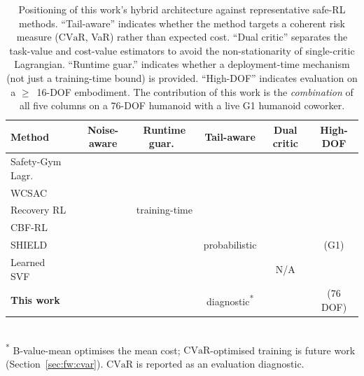 \documentclass[11pt,a4paper]{report}
\newcommand{\cvar}{\ensuremath{\mathrm{CVaR}}}
\newcommand{\cmark}{\ding{51}}
\newcommand{\xmark}{\ding{55}}
\begin{document}
\begin{table}[h]
\centering
\caption{Positioning of this work's hybrid architecture against
representative safe-RL methods. ``Tail-aware'' indicates whether the
method targets a coherent risk measure (\cvar{}, VaR) rather than
expected cost. ``Dual critic'' separates the task-value and
cost-value estimators to avoid the non-stationarity of
single-critic Lagrangian. ``Runtime guar.'' indicates whether a
deployment-time mechanism (not just a training-time bound) is
provided. ``High-DOF'' indicates evaluation on a $\ge$~16-DOF
embodiment. The contribution of this work is the \emph{combination}
of all five columns on a 76-DOF humanoid with a live G1 humanoid
coworker.}
\label{tab:related-work-comparison}
\small
\begin{tabular}{lccccc}
\toprule
Method & Noise-aware & Runtime guar.\ & Tail-aware & Dual critic & High-DOF \\
\midrule
Safety-Gym Lagr.~\cite{ray2019safetygym}    & \xmark & \xmark & \xmark & \xmark & \xmark \\
WCSAC~\cite{yang2021wcsac}                  & \xmark & \xmark & \cmark & \cmark & \xmark \\
Recovery RL~\cite{thananjeyan2021recovery}  & \xmark & training-time & \xmark & \cmark & \xmark \\
CBF-RL~\cite{cbfrl2024}                     & \xmark & \cmark & \xmark & \xmark & \xmark \\
SHIELD~\cite{shield2025}                    & \xmark & \cmark & probabilistic & \xmark & \cmark (G1) \\
Learned SVF~\cite{srinivasan2020learning}   & \xmark & \cmark & \xmark & N/A    & \xmark \\
\textbf{This work}                          & \cmark & \cmark & diagnostic\textsuperscript{*} & \cmark & \cmark (76 DOF) \\
\bottomrule
\end{tabular}\\
\footnotesize\textsuperscript{*} B-value-mean optimises the mean cost; \cvar{}-optimised training is future work (Section~\ref{sec:fw:cvar}). \cvar{} is reported as an evaluation diagnostic.
\end{table}
\end{document}
